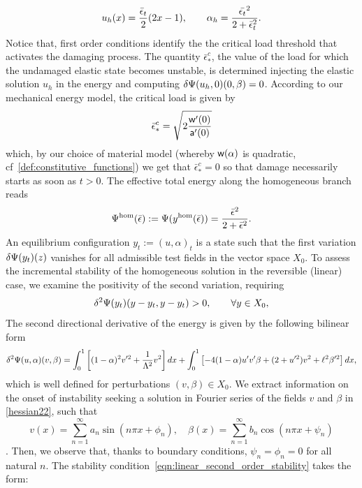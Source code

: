 \documentclass[10pt]{article}
\begin{document}
%
\begin{equation}
u_h(x) =  \frac{\bar \epsilon_t}{2}(2x-1),\qquad\alpha_h = \frac{\Bar{\epsilon_t}^2}{2 + \Bar\epsilon_t^2}\label{eq:homo1}.
\end{equation}
Notice that,  
first order conditions identify the the critical load threshold that activates the damaging process. The quantity $\bar\epsilon_*^c$, the value of the load for which the undamaged elastic state becomes unstable, is determined injecting the elastic solution $u_h$ in the energy and computing $\delta \Psi(u_h, 0)(0, \beta)=0$.
According to our mechanical energy model, the critical load is given by
\begin{equation}
    {{{\bar{\epsilon}^c}_*}} = \sqrt{2\frac{\mathsf{w}'(0)}{\mathsf{a}'(0)}} 
\end{equation}
%
%
which, by our choice of material model (whereby $\mathsf{w}(\alpha)$ is quadratic, cf~\eqref{def:constitutive_functions}) we get that $\bar{\epsilon}^c_*=0$ so that damage necessarily starts as soon as $t>0$.
The effective {total} energy along the {homogeneous} branch reads  
\begin{equation}
    \label{eq:energy_homogeneous}
    \Psi^\text{hom}(\bar\epsilon) :=\Psi(y^{\text{hom}}(\bar\epsilon)) = \frac{\Bar{\epsilon}^2}{2 + \Bar\epsilon^2}.
\end{equation}
An equilibrium configuration $y_t:=(u,\alpha)_t$ is a state such that the first variation $\delta \Psi(y_t)(z)$ vanishes for all admissible test fields in the vector space $X_0$. 
To assess the incremental stability of the homogeneous solution in the reversible (linear) case, we examine the positivity of the second variation, requiring
\begin{equation}
\delta^2 \Psi(y_t)(y-y_t, y-y_t)>0, \qquad  \forall y\in X_0,
\label{eqn:linear_second_order_stability}
\end{equation} 
{The second directional derivative of the energy is given by the following bilinear form}
\begin{equation}
\delta^2 \Estiff(u,\alpha)(v,\beta)=\int_0^1 \left[(1-\alpha)^2v'^2 
+\frac{1}{\elastell^2} v^2 \right]dx
%
+\int_0^1
\left[ - 4(1-\alpha)u' v'\beta+(2+ u'^2)v^2+\damagell^2\beta'^2 \right] dx, 
\label{hessian22}
\end{equation}
%
which is well defined for perturbations $(v, \beta)\in X_0$.
{We} extract information on the onset of instability  seeking a solution in Fourier series of the fields $v$ and $\beta$ in \eqref{hessian22}, such that $$v(x)=\sum_{n=1}^{\infty} a_{n} \sin \left(n \pi x+\phi_{n}\right), \quad \beta(x)=\sum_{n=1}^{\infty} b_{n} \cos \left(n \pi x+\psi_{n}\right)$$. Then, we observe that, thanks to boundary conditions, $\psi_{n}=\phi_{n}=0$ for all natural $n$. The stability condition~\eqref{eqn:linear_second_order_stability}  takes the form:
\end{document}
